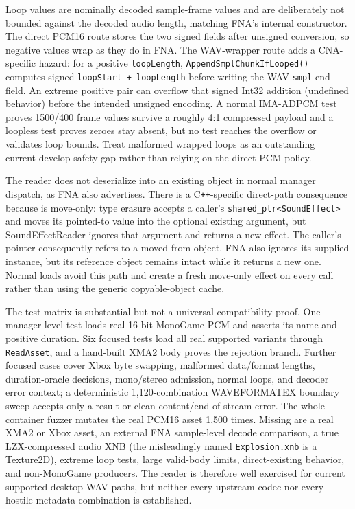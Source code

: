 Loop values are nominally decoded sample-frame values and are deliberately not bounded against
the decoded audio length, matching FNA's internal constructor. The direct PCM16 route stores the
two signed fields after unsigned conversion, so negative values wrap as they do in FNA. The
WAV-wrapper route adds a CNA-specific hazard: for a positive \texttt{loopLength},
\texttt{AppendSmplChunkIfLooped()} computes signed \texttt{loopStart + loopLength} before writing
the WAV \texttt{smpl} end field. An extreme positive pair can overflow that signed Int32 addition
(undefined behavior) before the intended unsigned encoding. A normal IMA-ADPCM test proves
1500/400 frame values survive a roughly 4:1 compressed payload and a loopless test proves zeroes
stay absent, but no test reaches the overflow or validates loop bounds. Treat malformed wrapped
loops as an outstanding current-develop safety gap rather than relying on the direct PCM policy.

The reader does not deserialize into an existing object in normal manager dispatch, as FNA also
advertises. There is a C\texttt{++}-specific direct-path consequence because 
is move-only: type erasure accepts a caller's \texttt{shared\_ptr<SoundEffect>} and moves its
pointed-to value into the optional existing argument, but SoundEffectReader ignores that argument
and returns a new effect. The caller's pointer consequently refers to a moved-from object. FNA
also ignores its supplied instance, but its reference object remains intact while it returns a
new one. Normal  loads avoid this path and create a fresh move-only effect
on every call rather than using the generic copyable-object cache.

The test matrix is substantial but not a universal compatibility proof. One manager-level test
loads real 16-bit MonoGame PCM and asserts its name and positive duration. Six focused tests load
all real supported variants through \texttt{ReadAsset}, and a hand-built XMA2 body proves the
rejection branch. Further focused cases cover Xbox byte swapping, malformed data/format lengths,
duration-oracle decisions, mono/stereo admission, normal loops, and decoder error context; a
deterministic 1,120-combination WAVEFORMATEX boundary sweep accepts only a result or clean
content/end-of-stream error. The whole-container fuzzer mutates the real PCM16 asset 1,500 times.
Missing are a real XMA2 or Xbox asset, an external FNA sample-level decode comparison, a true
LZX-compressed audio XNB (the misleadingly named \texttt{Explosion.xnb} is a Texture2D), extreme
loop tests, large valid-body limits, direct-existing behavior, and non-MonoGame producers. The
reader is therefore well exercised for current supported desktop WAV paths, but neither every
upstream codec nor every hostile metadata combination is established.

